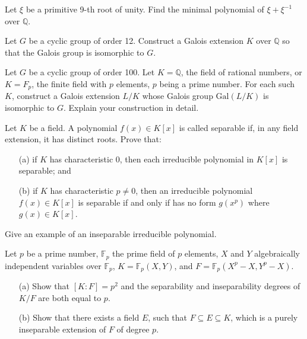 \begin{prob}[S2008-Q2]
    Let \(\xi\) be a primitive 9-th root of unity. Find the minimal polynomial of \(\xi + \xi^{-1}\) over \(\mathbb{Q}\).
\end{prob}


\begin{prob}[F2007-Q1]
    Let \(G\) be a cyclic group of order 12. Construct a Galois extension \(K\) over \(\mathbb{Q}\) so that the Galois group is isomorphic to \(G\).
\end{prob}


\begin{prob}[F2011-Q3]
    Let \(G\) be a cyclic group of order 100. Let \(K=\mathbb{Q}\), the field of rational numbers, or \(K=F_p\), the finite field with \(p\) elements, \(p\) being a prime number. For each such \(K\), construct a Galois extension \(L/K\) whose Galois group \(\text{Gal}(L/K)\) is isomorphic to \(G\). Explain your construction in detail.
\end{prob}



\begin{prob}[S2003-Q2]
    Let \(K\) be a field. A polynomial \(f(x) \in K[x]\) is called separable if, in any field extension, it has distinct roots. Prove that:
    \begin{itemize}
        \item[(a)] if \(K\) has characteristic 0, then each irreducible polynomial in \(K[x]\) is separable; and
        \item[(b)] if \(K\) has characteristic \(p \neq 0\), then an irreducible polynomial \(f(x) \in K[x]\) is separable if and only if has no form \(g(x^p)\) where \(g(x) \in K[x]\).
    \end{itemize}
    Give an example of an inseparable irreducible polynomial.
\end{prob}






\begin{prob}[S2001-Q4]
    Let \(p\) be a prime number, \(\mathbb{F}_p\) the prime field of \(p\) elements, \(X\) and \(Y\) algebraically independent variables over \(\mathbb{F}_p\), \(K=\mathbb{F}_p(X,Y)\), and \(F=\mathbb{F}_p(X^p-X,Y^p-X)\).
    \begin{itemize}
        \item[(a)] Show that \([K:F]=p^2\) and the separability and inseparability degrees of \(K/F\) are both equal to \(p\).
        \item[(b)] Show that there exists a field \(E\), such that \(F \subseteq E \subseteq K\), which is a purely inseparable extension of \(F\) of degree \(p\).
    \end{itemize}
\end{prob}




